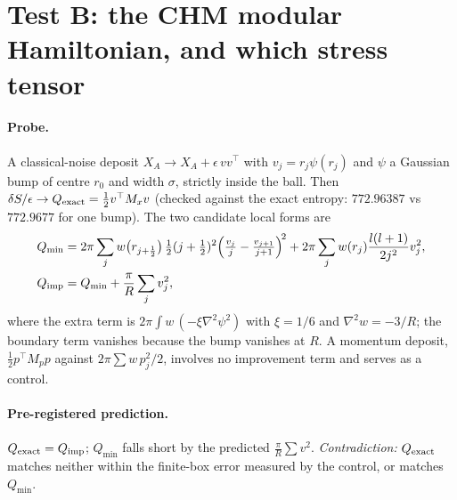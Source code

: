 \documentclass[11pt]{article}
\begin{document}
\section{Test B: the CHM modular Hamiltonian, and which stress tensor}
\paragraph{Probe.} A classical-noise deposit $X_A\to X_A+\epsilon\,vv^\top$ with $v_j=r_j\psi(r_j)$ and $\psi$ a Gaussian bump of centre $r_0$ and width $\sigma$, strictly inside the ball. Then $\delta S/\epsilon\to Q_{\rm exact}=\tfrac12v^\top M_xv$ (checked against the exact entropy: $772.96387$ vs $772.9677$ for one bump). The two candidate local forms are
\begin{align}
Q_{\min}&=2\pi\sum_j w\big(r_{j+\frac12}\big)\,\tfrac12(j+\tfrac12)^2\Big(\tfrac{v_j}{j}-\tfrac{v_{j+1}}{j+1}\Big)^{\!2}+2\pi\sum_j w(r_j)\frac{l(l+1)}{2j^2}v_j^2,\\
Q_{\rm imp}&=Q_{\min}+\frac{\pi}{R}\sum_j v_j^2 ,
\end{align}
where the extra term is $2\pi\int w\,(-\xi\nabla^2\psi^2)$ with $\xi=1/6$ and $\nabla^2w=-3/R$; the boundary term vanishes because the bump vanishes at $R$. A momentum deposit, $\tfrac12p^\top M_pp$ against $2\pi\sum w\,p_j^2/2$, involves no improvement term and serves as a control.

\paragraph{Pre-registered prediction.} $Q_{\rm exact}=Q_{\rm imp}$; $Q_{\min}$ falls short by the predicted $\tfrac{\pi}{R}\sum v^2$. \emph{Contradiction:} $Q_{\rm exact}$ matches neither within the finite-box error measured by the control, or matches $Q_{\min}$.
\end{document}
